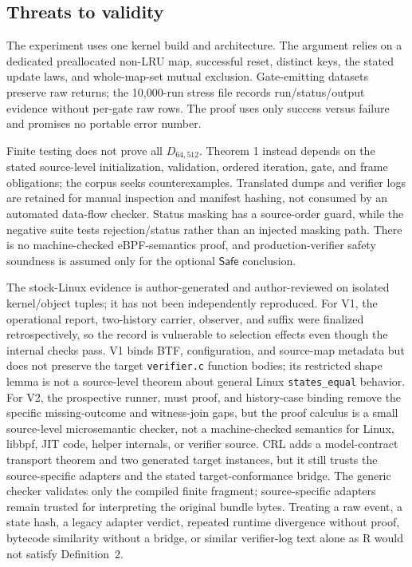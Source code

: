 \documentclass[conference]{IEEEtran}
\begin{document}
\subsection{Threats to validity}

The experiment uses one kernel build and architecture. The argument relies on a dedicated preallocated non-LRU map, successful reset, distinct keys, the stated update laws, and whole-map-set mutual exclusion. Gate-emitting datasets preserve raw returns; the 10,000-run stress file records run/status/output evidence without per-gate raw rows. The proof uses only success versus failure and promises no portable error number.

Finite testing does not prove all $D_{64,512}$. Theorem 1 instead depends on the stated source-level initialization, validation, ordered iteration, gate, and frame obligations; the corpus seeks counterexamples. Translated dumps and verifier logs are retained for manual inspection and manifest hashing, not consumed by an automated data-flow checker. Status masking has a source-order guard, while the negative suite tests rejection/status rather than an injected masking path. There is no machine-checked eBPF-semantics proof, and production-verifier safety soundness is assumed only for the optional $\mathsf{Safe}$ conclusion.

The stock-Linux evidence is author-generated and author-reviewed on isolated kernel/object tuples; it has not been independently reproduced. For V1, the operational report, two-history carrier, observer, and suffix were finalized retrospectively, so the record is vulnerable to selection effects even though the internal checks pass. V1 binds BTF, configuration, and source-map metadata but does not preserve the target \texttt{verifier.c} function bodies; its restricted shape lemma is not a source-level theorem about general Linux \texttt{states\_equal} behavior. For V2, the prospective runner, must proof, and history-case binding remove the specific missing-outcome and witness-join gaps, but the proof calculus is a small source-level microsemantic checker, not a machine-checked semantics for Linux, libbpf, JIT code, helper internals, or verifier source. CRL adds a model-contract transport theorem and two generated target instances, but it still trusts the source-specific adapters and the stated target-conformance bridge. The generic checker validates only the compiled finite fragment; source-specific adapters remain trusted for interpreting the original bundle bytes. Treating a raw event, a state hash, a legacy adapter verdict, repeated runtime divergence without proof, bytecode similarity without a bridge, or similar verifier-log text alone as R would not satisfy Definition~2.
\end{document}
